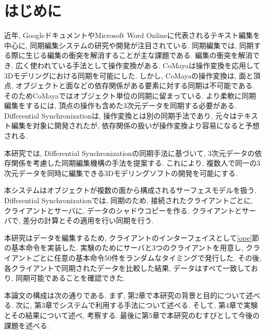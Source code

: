 \chapter{はじめに}
近年, Googleドキュメント\cite{GOOGLEDOCS}やMicrosoft Word Online\cite{WORDONLINE}に代表されるテキスト編集を中心に, 同期編集システムの研究や開発が注目されている.
同期編集では, 同期する際に生じる編集の衝突を解消することが主な課題である.
編集の衝突を解消でき, 広く使われている手法として操作変換がある.
CoMaya\cite{COMAYA}は操作変換を応用して3Dモデリングにおける同期を可能にした.
しかし, CoMayaの操作変換は, 面と頂点, オブジェクトと面などの依存関係がある要素に対する同期は不可能である.
そのためCoMayaではオブジェクト単位の同期に留まっている.
より柔軟に同期編集をするには, 頂点の操作も含めた3次元データを同期する必要がある.
Differential Synchronization\cite{DS}は, 操作変換とは別の同期手法であり, 元々はテキスト編集を対象に開発されたが, 依存関係の扱いが操作変換より容易になると予想される.
\par
本研究では, Differential Synchronizationの同期手法に基づいて, 3次元データの依存関係を考慮した同期編集機構の手法を提案する.
これにより, 複数人で同一の3次元データを同時に編集できる3Dモデリングソフトの開発を可能にする.
\par
本システムはオブジェクトが複数の面から構成されるサーフェスモデルを扱う. Differential Synchronizationでは, 同期のため, 接続されたクライアントごとに, クライアントとサーバに, データのシャドウコピーを作る. クライアントとサーバで, 差分の計算とその適用を行い同期を行う.
\par
本研究はデータを編集するため, クライアントのインターフェイスとして\ref{ope}節の基本命令を実装した.
実験のためにサーバと3つのクライアントを用意し, クライアントごとに任意の基本命令50件をランダムなタイミングで発行した.
 その後, 各クライアントで同期されたデータを比較した結果, データはすべて一致しており, 同期可能であることを確認できた.
\par
本論文の構成は次の通りである. まず, 第2章で本研究の背景と目的について述べる. 次に, 第3章でシステムで利用する手法について述べる. そして, 第4章で実験とその結果について述べ, 考察する. 最後に第5章で本研究のむすびとして今後の課題を述べる.
